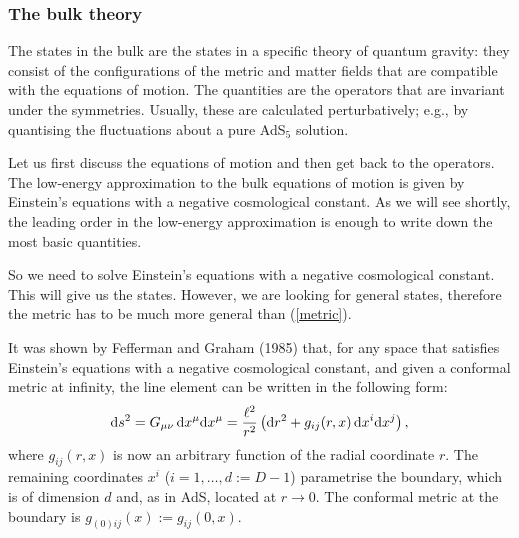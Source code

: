 \documentclass[12pt]{article}
\def\dd{\mbox{d}}
\def\m{\mu}
\def\n{\nu}
\renewcommand{\^}[1]{\hat{#1}}
\newcommand{\bea}{\begin{eqnarray}}
\newcommand{\eea}{\end{eqnarray}}
\newcommand{\eq}[1]{(\ref{#1})}
\begin{document}
\subsubsection{The bulk theory}\label{bulk}  
The states in the bulk are the states in a specific theory of quantum gravity: they consist of the configurations of the metric and matter fields that are compatible with the equations of motion. The quantities are the operators that are invariant under the symmetries. Usually, these are calculated perturbatively; e.g., by quantising the fluctuations about a pure AdS$_5$ solution. 

Let us first discuss the equations of motion and then get back to the operators. The low-energy approximation to the bulk equations of motion is given by Einstein's equations with a negative cosmological constant. As we will see shortly, the leading order in the low-energy approximation is enough to write down the most basic quantities.

So we need to solve Einstein's equations with a negative cosmological constant. This will give us the states. However, we are looking for general states, therefore the metric has to be much more general than \eq{metric}. 

It was shown by Fefferman and Graham (1985) that, for any space that satisfies Einstein's equations with a negative cosmological constant, and given a conformal metric at infinity, the line element can be written in the following form:
\bea\label{FG}
\dd s^2=G_{\m\n}\,\dd x^\m\dd x^\m={\ell^2\over r^2}\left(\dd r^2+g_{ij}(r,x)\,\dd x^i\dd x^j\right),
\eea
where $g_{ij}(r,x)$ is now an arbitrary function of the radial coordinate $r$. The remaining coordinates $x^i$ ($i=1,\ldots,d:=D-1$) parametrise the boundary, which is of dimension $d$ and, as in AdS, located at $r\rightarrow0$. The conformal metric at the boundary is $g_{(0)ij}(x):=g_{ij}(0,x)$. 
\end{document}
